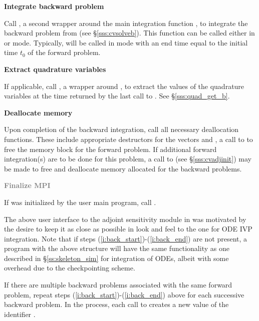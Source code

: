 \begin{Steps}
\item
  {\bf Integrate backward problem}

  Call , a second wrapper around the {\cvodes} main integration
  function , to integrate the backward problem from 
  (see \S\ref{sss:cvsolveb}). This function can be called either in 
  or  mode. Typically,  will be called in 
  mode with an end time equal to the initial time $t_0$ of the forward problem.

\item \label{i:back_end}
  {\bf Extract quadrature variables}

  If applicable, call , a wrapper around ,
  to extract the values of the quadrature variables at the time returned
  by the last call to . See \S\ref{sss:quad_get_b}.

\item
  {\bf Deallocate memory}

  Upon completion of the backward integration, call all necessary deallocation
  functions. These include appropriate destructors for the vectors 
   and , a call to  to free the {\cvodes} memory block 
  for the forward problem.  If additional forward integration(s) are to be done
  for this problem, a call to  (see \S\ref{sss:cvadjinit}) may be
  made to free and deallocate memory allocated for the backward problems. 

\item
  \textcolor{gray}{\bf Finalize MPI}

  {\p} If {\mpi} was initialized by the user main program, call .

\end{Steps}

The above user interface to the adjoint sensitivity module in {\cvodes} was motivated by
the desire to keep it as close as possible in look and feel to the one for ODE IVP 
integration. Note that if steps (\ref{i:back_start})-(\ref{i:back_end}) are not present, 
a program with the above structure will have the same functionality as one described in
\S\ref{ss:skeleton_sim} for integration of ODEs, albeit with some overhead due to 
the checkpointing scheme.

If there are multiple backward problems associated with the same forward problem,
repeat steps (\ref{i:back_start})-(\ref{i:back_end}) above for each successive
backward problem.  In the process, each call to  creates a new
value of the identifier .

